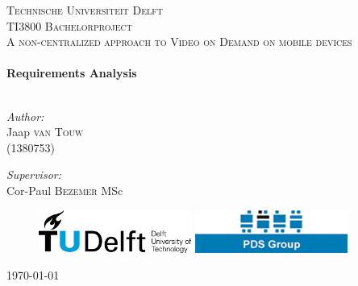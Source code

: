 \begin{titlepage}

\begin{center}



\textsc{\Large Technische Universiteit Delft }\\[1.5cm]
\textsc{\large TI3800 Bachelorproject}\\[0.5cm]
\textsc{\normalsize A non-centralized approach to Video on Demand on mobile devices}\\[0.5cm]


\HRule \\[0.4cm]
{ \huge \bfseries Requirements Analysis}\\[0.4cm]

\HRule \\[1.5cm]

\begin{minipage}{0.4\textwidth}
\begin{flushleft} \large
\emph{Author:}\\
Jaap \textsc{van Touw} \\(1380753)\\ [0.1cm]
\end{flushleft}
\end{minipage}
\begin{minipage}{0.4\textwidth}
\begin{flushright} \large
\emph{Supervisor:} \\
Cor-Paul \textsc{Bezemer} MSc
\end{flushright}
\end{minipage}
\vspace{30mm}
\begin{figure}[ht!]
\centering
\includegraphics[width=50mm]{TUDLogo.png}
\hspace{10mm}
\includegraphics[width=50mm]{pdslogo.png}
\label{overflow}
\end{figure}
\vfill

{\large \today}

\end{center}

\end{titlepage}
